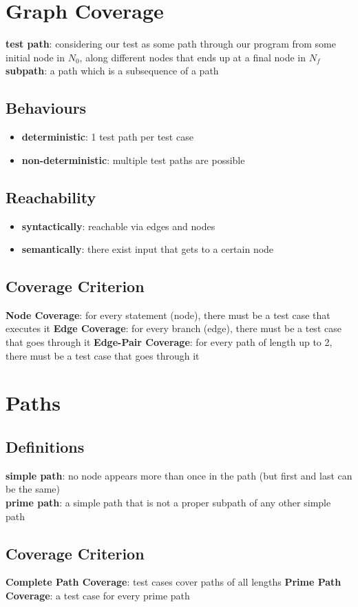 \documentclass[]{article}
\theoremstyle{definition}
\begin{document}
	\section{Graph Coverage}
		\textbf{test path}: considering our test as some path through our program from some initial node in $N_0$, along different nodes that ends up at a final node in $N_f$ \\
		\textbf{subpath}: a path which is a subsequence of a path
		\subsection{Behaviours}
			\begin{itemize}	
				\item \textbf{deterministic}: 	1 test path per test case
				\item \textbf{non-deterministic}: 	multiple test paths are possible
			\end{itemize}
		\subsection{Reachability}
			\begin{itemize}
				\item \textbf{syntactically}:	reachable via edges and nodes
				\item \textbf{semantically}:	there exist input that gets to a certain node
			\end{itemize}
		\subsection{Coverage Criterion}
			\textbf{Node Coverage}: for every statement (node), there must be a test case that executes it
			\textbf{Edge Coverage}: for every branch (edge), there must be a test case that goes through it
			\textbf{Edge-Pair Coverage}: for every path of length up to 2, there must be a test case that goes through it
	\section{Paths}
		\subsection{Definitions}
			\textbf{simple path}: no node appears more than once in the path (but first and last can be the same) \\
			\textbf{prime path}: a simple path that is not a proper subpath of any other simple path
		\subsection{Coverage Criterion}
			\textbf{Complete Path Coverage}: test cases cover paths of all lengths
			\textbf{Prime Path Coverage}: a test case for every prime path
			
\end{document}
